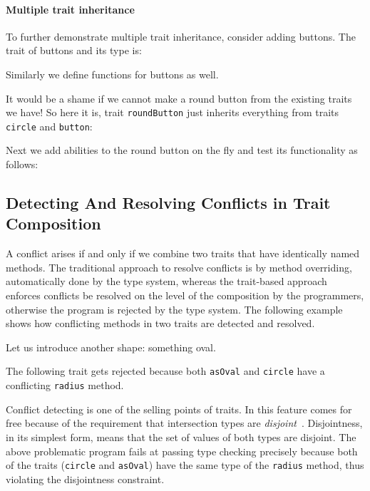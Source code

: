 \paragraph{Multiple trait inheritance} To further demonstrate multiple
trait inheritance, consider adding buttons. The trait of buttons and its type is:

Similarly we define functions for buttons as well.

It would be a shame if we cannot make a round button from the existing traits we
have! So here it is, trait \lstinline{roundButton} just inherits everything from
traits \lstinline{circle} and \lstinline{button}:

Next we add abilities to the round button on the fly and test its functionality
as follows:



\subsection{Detecting And Resolving Conflicts in Trait Composition}
\label{sec:conflicts}

A conflict arises if and only if we combine two traits that have identically
named methods. The traditional approach to resolve conflicts is by method
overriding, automatically done by the type system, whereas the trait-based
approach enforces conflicts be resolved on the level of the composition by the
programmers, otherwise the program is rejected by the type system. The following
example shows how conflicting methods in two traits are detected and resolved.

Let us introduce another shape: something oval.

The following trait gets rejected because both \lstinline{asOval} and
\lstinline{circle} have a conflicting \lstinline{radius} method.

Conflict detecting is one of the selling points of traits. In \name this feature
comes for free because of the requirement that intersection types are
\textit{disjoint}~\cite{oliveira2016disjoint}. Disjointness, in its simplest
form, means that the set of values of both types are disjoint. The above
problematic program fails at passing type checking precisely because both of the
traits (\lstinline{circle} and \lstinline{asOval}) have the same type of the
\lstinline{radius} method, thus violating the disjointness constraint.

